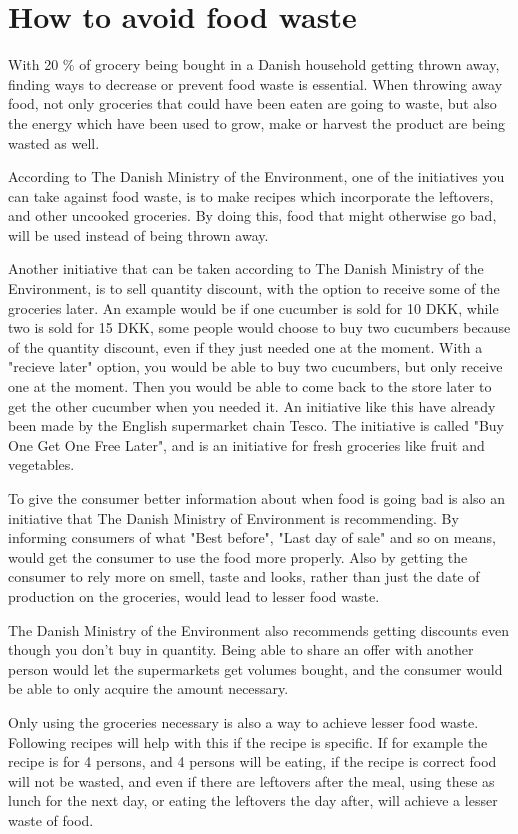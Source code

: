 \section{How to avoid food waste}
With 20 \% of grocery being bought in a Danish household getting thrown away, finding ways to decrease or prevent food waste is essential. When throwing away food, not only groceries that could have been eaten are going to waste, but also the energy which have been used to grow, make or harvest the product are being wasted as well.

According to The Danish Ministry of the Environment\cite{madSpild_Notat}, one of the initiatives you can take against food waste, is to make recipes which incorporate the leftovers, and other uncooked groceries. By doing this, food that might otherwise go bad, will be used instead of being thrown away.

Another initiative that can be taken according to The Danish Ministry of the Environment, is to sell quantity discount, with the option to receive some of the groceries later. An example would be if one cucumber is sold for 10 DKK, while two is sold for 15 DKK, some people would choose to buy two cucumbers because of the quantity discount, even if they just needed one at the moment. With a "recieve later" option, you would be able to buy two cucumbers, but only receive one at the moment. Then you would be able to come back to the store later to get the other cucumber when you needed it. An initiative like this have already been made by the English supermarket chain Tesco. The initiative is called "Buy One Get One Free Later", and is an initiative for fresh groceries like fruit and vegetables.

To give the consumer better information about when food is going bad is also an initiative that The Danish Ministry of Environment is recommending. By informing consumers of what "Best before", "Last day of sale" and so on means, would get the consumer to use the food more properly. Also by getting the consumer to rely more on smell, taste and looks, rather than just the date of production on the groceries, would lead to lesser food waste.

The Danish Ministry of the Environment also recommends getting discounts even though you don't buy in quantity. Being able to share an offer with another person would let the supermarkets get volumes bought, and the consumer would be able to only acquire the amount necessary.

Only using the groceries necessary is also a way to achieve lesser food waste. Following recipes will help with this if the recipe is specific. If for example the recipe is for 4 persons, and 4 persons will be eating, if the recipe is correct food will not be wasted, and even if there are leftovers after the meal, using these as lunch for the next day, or eating the leftovers the day after, will achieve a lesser waste of food\cite{madSpild_MindreMadspild}.

